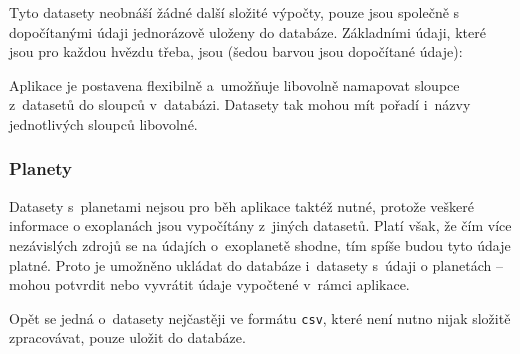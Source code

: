 \documentclass[a4paper,12pt]{article}
\def\code#1{\texttt{#1}}
\begin{document}
{{{{{{{{

Tyto datasety neobnáší žádné další složité výpočty, pouze jsou společně s dopočítanými údaji jednorázově uloženy do databáze. Základními údaji, které jsou pro každou hvězdu třeba, jsou (šedou barvou jsou dopočítané údaje):


Aplikace je postavena flexibilně a~umožňuje libovolně namapovat sloupce z~datasetů do sloupců v~databázi. Datasety tak mohou mít pořadí i~názvy jednotlivých sloupců libovolné.


\subsubsection{Planety}

Datasety s~planetami nejsou pro běh aplikace taktéž nutné, protože veškeré informace o exoplanách jsou vypočítány z~jiných datasetů. Platí však, že čím více nezávislých zdrojů se na údajích o~exoplanetě shodne, tím spíše budou tyto údaje platné. Proto je umožněno ukládat do databáze i~datasety s~údaji o planetách -- mohou potvrdit nebo vyvrátit údaje vypočtené v~rámci aplikace.


Opět se jedná o~datasety nejčastěji ve formátu \code{csv}, které není nutno nijak složitě zpracovávat, pouze uložit do databáze.


}}}}}}}}
\end{document}
